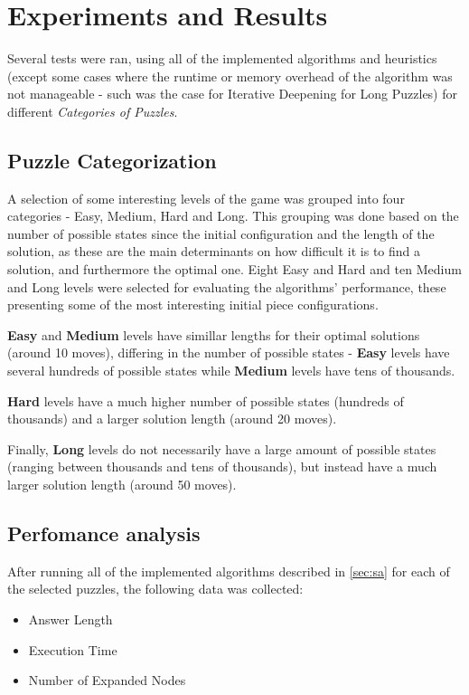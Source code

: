 \documentclass[conference]{IEEEtran}
\begin{document}
\section{Experiments and Results}
Several tests were ran, using all of the implemented algorithms and heuristics (except some cases where the runtime or memory overhead of the algorithm was not manageable - such was the case for Iterative Deepening for Long Puzzles) for different \textit{Categories of Puzzles}.

\subsection{Puzzle Categorization}

A selection of some interesting levels of the game was grouped into four categories - Easy, Medium, Hard and Long. This grouping was done based on the number of possible states since the initial configuration and the length of the solution, as these are the main determinants on how difficult it is to find a solution, and furthermore the optimal one. Eight Easy and Hard and ten Medium and Long levels were selected for evaluating the algorithms' performance, these presenting some of the most interesting initial piece configurations.

\textbf{Easy} and \textbf{Medium} levels have simillar lengths for their optimal solutions (around 10 moves), differing in the number of possible states - \textbf{Easy} levels have several hundreds of possible states while \textbf{Medium} levels have tens of thousands.

\textbf{Hard} levels have a much higher number of possible states (hundreds of thousands) and a larger solution length (around 20 moves).

Finally, \textbf{Long} levels do not necessarily have a large amount of possible states (ranging between thousands and tens of thousands), but instead have a much larger solution length (around 50 moves).

\subsection{Perfomance analysis}

After running all of the implemented algorithms described in \autoref{sec:sa} for each of the selected puzzles, the following data was collected:

\begin{itemize}
    \item Answer Length
    \item Execution Time
    \item Number of Expanded Nodes
\end{itemize}
\end{document}
